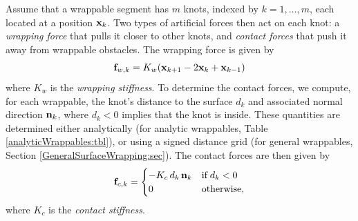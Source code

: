 Assume that a wrappable segment has $m$ knots, indexed by $k =
1, \ldots, m$, each located at a position ${\bf x}_k$. Two types of
artificial forces then act on each knot: a {\it wrapping force}
that pulls it closer to other knots, and {\it contact forces} that
push it away from wrappable obstacles. The wrapping force is given by
%
\begin{equation*}
{\bf f}_{w,k} = K_w ({\bf x}_{k+1} - 2 {\bf x}_k + {\bf x}_{k-1})
\end{equation*}
%
where $K_w$ is the {\it wrapping stiffness}. To determine the contact
forces, we compute, for each wrappable, the knot's distance to the
surface $d_k$ and associated normal direction ${\bf n}_k$, where $d_k < 0$
implies that the knot is inside. These quantities are determined
either analytically (for analytic wrappables, Table
\ref{analyticWrappables:tbl}), or using a signed distance grid (for
general wrappables, Section \ref{GeneralSurfaceWrapping:sec}).  The
contact forces are then given by
%
\begin{equation*}
{\bf f}_{c,k} = 
\begin{cases}
-K_c \, d_k \, {\bf n}_k & \text{if} \; d_k < 0 \\
0 & \text{otherwise},
\end{cases}
\end{equation*}
%
where $K_c$ is the {\it contact stiffness}.

